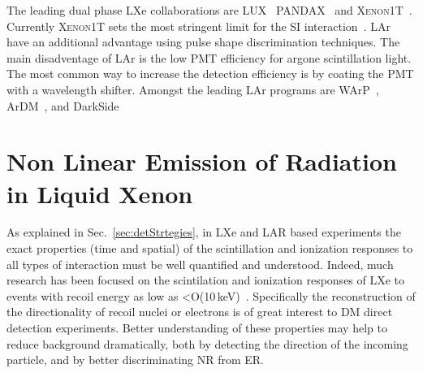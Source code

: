 The leading dual phase LXe collaborations are LUX~\cite{Akerib:2012ys} PANDAX~\cite{Cao:2014jsa} and \textsc{Xenon1T}~\cite{Aprile:2017aty}. Currently \textsc{Xenon1T} sets the most stringent limit for the SI interaction~\cite{Xenon1TResults}. LAr have an additional advantage using  pulse shape discrimination techniques. The main disadventage of LAr is the low PMT efficiency for argone scintillation light. The most common way to increase the detection efficiency is by coating the PMT with a wavelength shifter. Amongst the leading LAr programs are WArP~\cite{Zani:2014lea}, ArDM~\cite{Rubbia:2005ge}, and DarkSide~\cite{Alexander:2013hia}  

\section{Non Linear Emission of Radiation in Liquid Xenon}
\label{sec:intro_superradiance}
As explained in Sec.~\ref{sec:detStrtegies}, in LXe and LAR based experiments the exact properties (time and spatial) of the scintillation and ionization responses to all types of interaction must be well quantified and understood. Indeed, much research has been focused on the scintilation and ionization responses of LXe to events with recoil energy as low as <O(10\,keV)~\cite{Manzur:2009hp,Aprile:2012an,Baudis:2013cca,Akerib:2016mzi}.
Specifically the reconstruction of the directionality of recoil nuclei or electrons is of great interest to DM direct detection experiments. Better understanding of these properties may help to reduce background dramatically, both by detecting the direction of the incoming particle, and by better discriminating NR from ER. 

